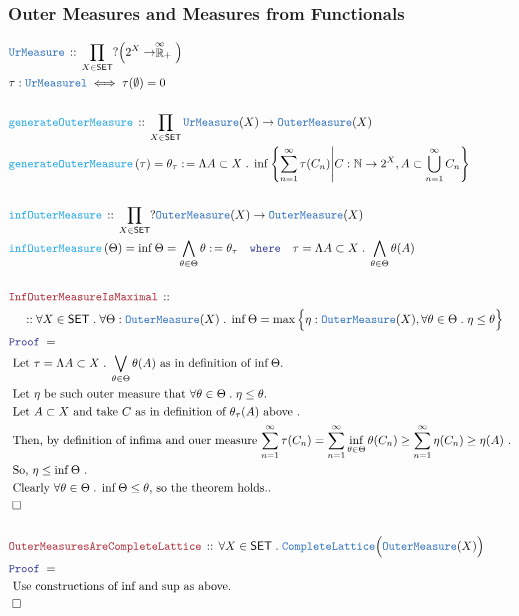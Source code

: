 \documentclass[12pt]{scrartcl}
\newcommand{\TYPE}[1]{\textcolor{NavyBlue}{\mathtt{#1}}}
\newcommand{\FUNC}[1]{\textcolor{Cerulean}{\mathtt{#1}}}
\newcommand{\LOGIC}[1]{\textcolor{Blue}{\mathtt{#1}}}
\newcommand{\THM}[1]{\textcolor{Maroon}{\mathtt{#1}}}
\renewcommand{\.}{\; . \;}
\newcommand{\de}{: \kern 0.1pc =}
\newcommand{\where}{\LOGIC{where}}
\newcommand{\Act}[1]{\left( #1 \right)}
\newcommand{\Theorem}[2]{& \THM{#1} \, :: \, #2 \\ & \Proof = \\ }
\newcommand{\DeclareType}[2]{& \TYPE{#1} \, :: \, #2 \\}
\newcommand{\DefineType}[3]{& #1 : \TYPE{#2} \iff #3 \\}
\newcommand{\DeclareFunc}[2]{& \FUNC{#1} \, :: \, #2 \\}
\newcommand{\DefineNamedFunc}[4]{&  \FUNC{#1}\Act{#2} = #3 \de #4 \\}
\newcommand{\NewLine}{\\ & \kern 1pc}
\newcommand{\Page}[1]{ \begin{align*} #1 \end{align*}   }
\newcommand{\Nat}{\mathbb{N} }
\newcommand{\EReals}{\stackrel{\mathclap{\infty}}{\mathbb{R}}}
\newcommand{\QED}{\; \square}
\newcommand{\EndProof}{& \QED \\}
\newcommand{\Proof}{\LOGIC{Proof} \; }
\newcommand{\Explain}[1]{& \text{#1.} \\}
\newcommand{\SET}{\mathsf{SET}}
\newcommand{\OM}{\TYPE{OuterMeasure}}
\begin{document}
\subsubsection{Outer Measures and Measures from Functionals}
\Page{
	\DeclareType{UrMeasure}
	{
		\prod_{X \in \SET} ?\Big(2^X \to \EReals_+ \Big)	
	}
	\DefineType{\tau}{UrMeasurel}{\tau(\emptyset) = 0}
	\\
	\DeclareFunc{generateOuterMeasure}
	{
		\prod_{X \in \SET} \TYPE{UrMeasure}(X) \to \OM(X)
	}
	\DefineNamedFunc{generateOuterMeasure}{\tau}{\theta_\tau}
	{
		\Lambda A \subset X \. 
		\inf \left\{
			\sum^\infty_{n=1} \tau(C_n) \Bigg|
				 C : \Nat \to 2^X,  A \subset \bigcup^\infty_{n=1} C_n
		\right\}
	}
	\\
	\DeclareFunc{infOuterMeasure}
	{
		\prod_{X \in \SET}  ?\OM(X) \to \OM(X)
	}
	\DefineNamedFunc{infOuterMeasure}{\Theta}{\inf \Theta = \bigwedge_{\theta \in \Theta} \theta}
	{
		\theta_\tau \quad \where \quad \tau = \Lambda A \subset X \. 
		\bigwedge_{\theta \in \Theta} \theta(A)
	}
	\\
	\Theorem{InfOuterMeasureIsMaximal}
	{
		\NewLine ::		
		\forall X \in \SET \. 
		\forall \Theta : \OM(X) \. 
		\inf \Theta = \max \Big\{ \eta : \OM(X), \forall \theta \in \Theta \. \eta \le \theta  \Big\} 
	}
	\Explain{ Let $\tau = \Lambda A \subset X \. \bigvee_{\theta \in \Theta} \theta(A)$ 
		as in definition of $\inf \Theta$}
	\Explain{ Let $\eta$ be such outer measure that $\forall \theta \in \Theta \. \eta \le \theta$}
	\Explain{ Let $A \subset X$ and take $C$ as in definition of $\theta_\tau(A)$ above }
	\Explain{ Then, by definition of infima and ouer measure
				$
							\sum^\infty_{n=1} \tau(C_n)  =
							\sum^\infty_{n=1} \inf_{\theta \in \Theta}\theta(C_n) \ge 
							\sum^\infty_{n=1} \eta(C_n) \ge 
							\eta(A)
				$
	}
	\Explain{ So, $\eta \le \inf \Theta$ }
	\Explain{ Clearly $\forall \theta \in \Theta \. \inf \Theta \le \theta$, so the theorem holds.}
	\EndProof
	\\
	\Theorem{OuterMeasuresAreCompleteLattice}
	{
		\forall X \in \SET \. 
		\TYPE{CompleteLattice}\Big( \OM(X) \Big)
	}
	\Explain{ Use constructions of inf and sup as above}
	\EndProof
}
\newpage
\end{document}
